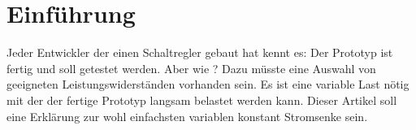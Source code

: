\section{Einführung}	%

Jeder Entwickler der einen Schaltregler gebaut hat kennt es: Der Prototyp ist fertig und 
soll getestet werden. Aber wie ? 
Dazu müsste eine Auswahl von geeigneten Leistungswiderständen vorhanden sein. 
Es ist eine variable Last nötig mit der der fertige Prototyp langsam belastet werden kann. 
Dieser Artikel soll eine Erklärung zur wohl einfachsten variablen konstant Stromsenke sein.

